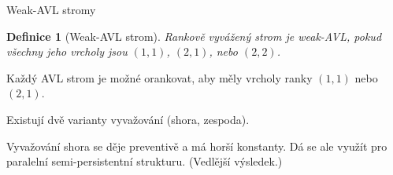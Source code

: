 \documentclass{beamer}
\theoremstyle{mytheoremstyle}
\newtheorem{dfn}{Definice}
\begin{document}
\begin{frame}{Weak-AVL stromy}
\begin{dfn}[Weak-AVL strom]
Rankově vyvážený strom je weak-AVL, pokud všechny jeho vrcholy jsou $(1,1)$, $(2,1)$, nebo $(2,2)$.
\end{dfn}

\pause

Každý AVL strom je možné orankovat, aby měly vrcholy ranky $(1,1)$ nebo $(2,1)$.

\pause

Existují dvě varianty vyvažování (shora, zespoda). 

Vyvažování shora se děje preventivě a má horší konstanty. Dá se ale využít pro paralelní semi-persistentní strukturu. (Vedlější výsledek.)
\end{frame}
\end{document}
